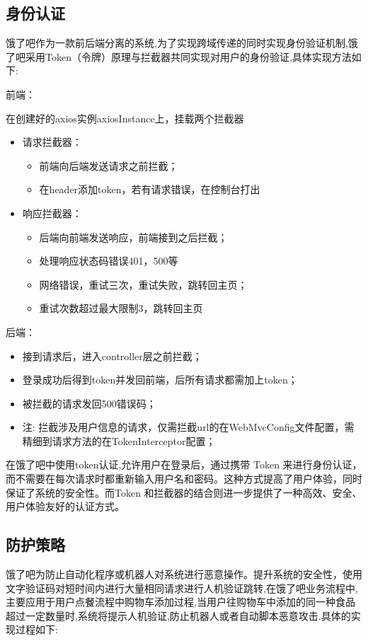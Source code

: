 \subsection{身份认证}
饿了吧作为一款前后端分离的系统,为了实现跨域传递的同时实现身份验证机制,饿了吧采用Token（令牌）原理与拦截器共同实现对用户的身份验证,具体实现方法如下:

前端：

在创建好的axios实例axiosInstance上，挂载两个拦截器
\begin{itemize}
\item 请求拦截器：
\begin{itemize}
    \item 前端向后端发送请求之前拦截；
    \item 在header添加token，若有请求错误，在控制台打出
\end{itemize}
\item 响应拦截器：
\begin{itemize}
    \item 后端向前端发送响应，前端接到之后拦截；
    \item 处理响应状态码错误401，500等
    \item 网络错误，重试三次，重试失败，跳转回主页；
    \item 重试次数超过最大限制3，跳转回主页
\end{itemize}
\end{itemize}
后端：

\begin{itemize}
    \item 接到请求后，进入controller层之前拦截；
    \item 登录成功后得到token并发回前端，后所有请求都需加上token；
    \item 被拦截的请求发回500错误码；
    \footnotesize
    \item 注: 拦截涉及用户信息的请求，仅需拦截url的在WebMvcConfig文件配置，需精细到请求方法的在TokenInterceptor配置；
    \normalsize
\end{itemize}

在饿了吧中使用token认证,允许用户在登录后，通过携带 Token 来进行身份认证，而不需要在每次请求时都重新输入用户名和密码。这种方式提高了用户体验，同时保证了系统的安全性。而Token 和拦截器的结合则进一步提供了一种高效、安全、用户体验友好的认证方式。

\subsection{防护策略}
饿了吧为防止自动化程序或机器人对系统进行恶意操作。提升系统的安全性，使用文字验证码对短时间内进行大量相同请求进行人机验证跳转,在饿了吧业务流程中,主要应用于用户点餐流程中购物车添加过程,当用户往购物车中添加的同一种食品超过一定数量时,系统将提示人机验证,防止机器人或者自动脚本恶意攻击.具体的实现过程如下:

